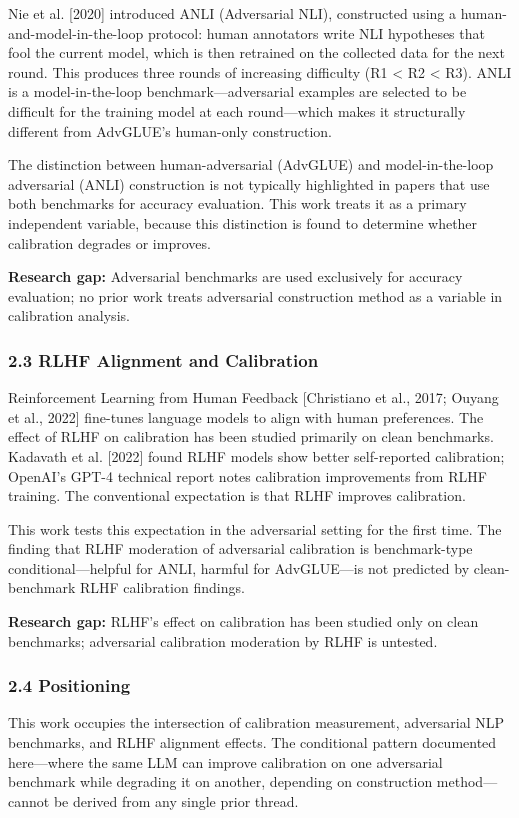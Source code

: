 Nie et al. [2020] introduced ANLI (Adversarial NLI), constructed using a human-and-model-in-the-loop protocol: human annotators write NLI hypotheses that fool the current model, which is then retrained on the collected data for the next round. This produces three rounds of increasing difficulty (R1 < R2 < R3). ANLI is a model-in-the-loop benchmark---adversarial examples are selected to be difficult for the training model at each round---which makes it structurally different from AdvGLUE's human-only construction.

The distinction between human-adversarial (AdvGLUE) and model-in-the-loop adversarial (ANLI) construction is not typically highlighted in papers that use both benchmarks for accuracy evaluation. This work treats it as a primary independent variable, because this distinction is found to determine whether calibration degrades or improves.

\textbf{Research gap:} Adversarial benchmarks are used exclusively for accuracy evaluation; no prior work treats adversarial construction method as a variable in calibration analysis.

\subsubsection{2.3 RLHF Alignment and Calibration}

Reinforcement Learning from Human Feedback [Christiano et al., 2017; Ouyang et al., 2022] fine-tunes language models to align with human preferences. The effect of RLHF on calibration has been studied primarily on clean benchmarks. Kadavath et al. [2022] found RLHF models show better self-reported calibration; OpenAI's GPT-4 technical report \citep{OpenAI2023} notes calibration improvements from RLHF training. The conventional expectation is that RLHF improves calibration.

This work tests this expectation in the adversarial setting for the first time. The finding that RLHF moderation of adversarial calibration is benchmark-type conditional---helpful for ANLI, harmful for AdvGLUE---is not predicted by clean-benchmark RLHF calibration findings.

\textbf{Research gap:} RLHF's effect on calibration has been studied only on clean benchmarks; adversarial calibration moderation by RLHF is untested.

\subsubsection{2.4 Positioning}

This work occupies the intersection of calibration measurement, adversarial NLP benchmarks, and RLHF alignment effects. The conditional pattern documented here---where the same LLM can improve calibration on one adversarial benchmark while degrading it on another, depending on construction method---cannot be derived from any single prior thread.


